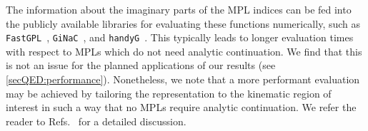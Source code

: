 \documentclass[main.tex]{subfiles}
\begin{document}
\smallskip

The information about the imaginary parts of the MPL indices can be fed into the publicly available libraries for evaluating these functions numerically, such as \texttt{FastGPL}~\cite{Wang:2021imw}, \texttt{GiNaC}~\cite{Bauer:2000cp, Vollinga:2004sn}, and \texttt{handyG}~\cite{Naterop:2019xaf}. This typically leads to longer evaluation times with respect to MPLs which do not need analytic continuation. We find that this is not an issue for the planned applications of our results (see \cref{secQED:performance}). Nonetheless, we note that a more performant evaluation may be achieved by tailoring the representation to the kinematic region of interest in such a way that no MPLs require analytic continuation. We refer the reader to Refs.~\cite{Gehrmann:2002zr, Gehrmann:2023etk} for a detailed discussion. 
\end{document}
